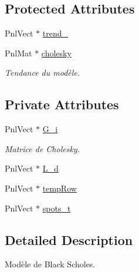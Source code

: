 \subsection*{Protected Attributes}
\begin{DoxyCompactItemize}
\item 
Pnl\-Vect $\ast$ \hyperlink{classBlackScholesModel_af92b535c61f17e7a16af56952739302f}{trend\-\_\-}
\item 
Pnl\-Mat $\ast$ \hyperlink{classBlackScholesModel_a24f36715c6f6b87de76c6fb3067e4e2f}{cholesky}
\begin{DoxyCompactList}\small\item\em Tendance du modèle. \end{DoxyCompactList}\end{DoxyCompactItemize}
\subsection*{Private Attributes}
\begin{DoxyCompactItemize}
\item 
Pnl\-Vect $\ast$ \hyperlink{classBlackScholesModel_ac790e18c09330dc3e62f77e34f3a64a4}{G\-\_\-i}
\begin{DoxyCompactList}\small\item\em Matrice de Cholesky. \end{DoxyCompactList}\item 
Pnl\-Vect $\ast$ \hyperlink{classBlackScholesModel_aae8afe7aed64436e11b245a472135404}{L\-\_\-d}
\item 
Pnl\-Vect $\ast$ \hyperlink{classBlackScholesModel_a28428fd6090bc1062d0ec7612feeaac0}{temp\-Row}
\item 
Pnl\-Vect $\ast$ \hyperlink{classBlackScholesModel_a18801c05f4b88b9cbf39fb48bd8beed4}{spots\-\_\-t}
\end{DoxyCompactItemize}


\subsection{Detailed Description}
Modèle de Black Scholes. 

